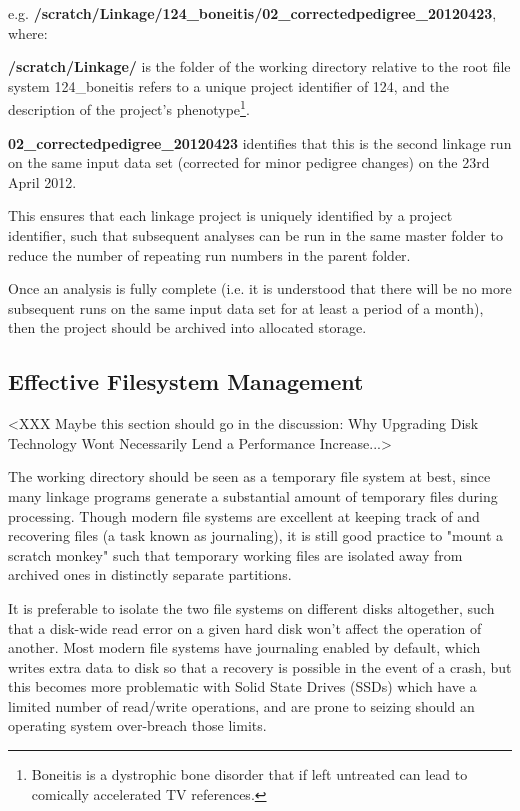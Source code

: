 e.g. {\bf\footnotesize /scratch/Linkage/124\_boneitis/02\_correctedpedigree\_20120423},  where:
\begin{description}
\item{{\bf\footnotesize /scratch/Linkage/} is the folder of the working directory relative to the root file system
124\_boneitis refers to a unique project identifier of 124, and the description of the project's phenotype\footnote{Boneitis is a dystrophic bone disorder that if left untreated can lead to comically accelerated TV references.}.}
\item{{\bf\footnotesize 02\_correctedpedigree\_20120423} identifies that this is the second linkage run on the same input data set (corrected for minor pedigree changes) on the 23rd April 2012.}
\end{description}

This ensures that each linkage project is uniquely identified by a project identifier, such that subsequent analyses can be run in the same master folder to reduce the number of repeating run numbers in the parent folder.

Once an analysis is fully complete (i.e. it is understood that there will be no more subsequent runs on the same input data set for at least a period of a month), then the project should be archived into allocated storage.

\subsection{Effective Filesystem Management}

<XXX Maybe this section should go in the discussion: Why Upgrading Disk Technology Wont Necessarily Lend a Performance Increase...>

The working directory should be seen as a temporary file system at best, since many linkage programs generate a substantial amount of temporary files during processing. Though modern file systems are excellent at keeping track of and recovering files (a task known as \gls{journaling}), it is still good practice to "mount a scratch monkey" such that temporary working files are isolated away from archived ones in distinctly separate partitions. 

It is preferable to isolate the two file systems on different disks altogether, such that a disk-wide read error on a given hard disk won't affect the operation of another. Most modern file systems have journaling enabled by default, which writes extra data to disk so that a recovery is possible in the event of a crash, but this becomes more problematic with Solid State Drives (\gls{SSD}s) which have a limited number of read/write operations, and are prone to seizing should an operating system over-breach those limits.


